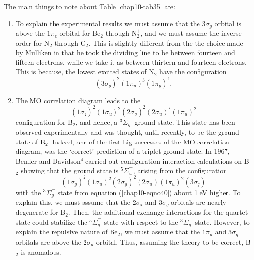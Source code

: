 The main things to note about Table \ref{chap10-tab35} are:
\begin{enumerate}
\item To explain the experimental results we must assume that the $3
\sigma_g$ orbital is above the $1 \pi_u$ orbital for Be$_2$ through
N$^+_2$, and we must assume the inverse order for N$_2$ through O$_2$.
This is slightly different from the the choice made by Mulliken in
that he took the dividing line to be between fourteen and fifteen
electrons, while we take it as between thirteen and fourteen
electrons.  This is because, the lowest excited states of N$_2$ have
the configuration
\begin{equation}
( 3 \sigma_g )^2 (1 \pi_u )^3 ( 1 \pi_g )^1 .
\end{equation}

\item The MO correlation diagram leads to the
\begin{equation}
( 1 \sigma_g )^2 ( 1 \sigma_u )^2 ( 2 \sigma_g )^2 ( 2 \sigma_u )^2 ( 
1 \pi_u )^2
\label{chap10-eqno40}
\end{equation}
configuration for B$_2$, and hence, a ${^3\Sigma}^-_g$ ground 
state. This state has
been observed experimentally and was thought, until recently, to be
the ground state of B$_2$.  Indeed, one of the first big successes of the
MO correlation diagram, was the `correct' prediction of a triplet
ground state.  In 1967, Bender and Davidson$^4$ carried out 
configuration interaction calculations
on B$_2$ showing that the ground state is ${^5\Sigma}^-_u$, arising from the
configuration
\begin{equation}
( 1 \sigma_g )^2 ( 1 \sigma_u )^2 ( 2 \sigma_g )^2 ( 2 \sigma_u ) 
( 1 \pi_u )^2 ( 3 \sigma_g )
\end{equation}
with the ${^3\Sigma}^-_g$ state from equation (\ref{chap10-eqno40})
about 1 eV higher.  To explain this, we must assume that the $2
\sigma_u$ and $3 \sigma_g$ orbitals are nearly degenerate for B$_2$.
Then, the additional exchange interactions for the quartet state could
stabilize the ${^5\Sigma}^-_g$ state with respect to the
${^3\Sigma}^-_g$ state.  However, to explain the repulsive nature of
Be$_2$, we must assume that the $1 \pi_u$ and $3 \sigma_g$ orbitals
are above the $2\sigma_u$ orbital. Thus, assuming the theory to be
correct, B$_2$ is anomalous.


\end{enumerate}
